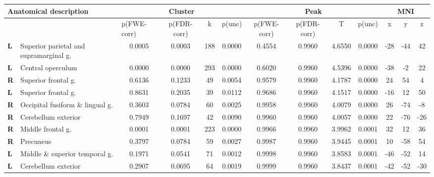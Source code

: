 \begin{landscape}
\begin{fullwidth}
\begin{table}[!ht]
    \vspace{-4cm}
    \raggedright
    \footnotesize
    \begin{tabular}{ll|cccc|cccc|ccc} \\ \hline
        \multicolumn{2}{l}{\textbf{Anatomical description}} & \multicolumn{4}{c}{\textbf{Cluster}} & \multicolumn{4}{c}{\textbf{Peak}} &  \multicolumn{3}{c}{\textbf{MNI}} \\ \hline
        \multicolumn{2}{l}{\textbf{}} & \multicolumn{1}{l}{p(FWE-corr)} & p(FDR-corr) & k & \multicolumn{1}{l}{p(unc)} & p(FWE-corr) & p(FDR-corr) & T & \multicolumn{1}{l}{p(unc)} & x & y & z \\ \hline
        \textbf{L} & Superior parietal and supramarginal g. & 0.0005 & 0.0003 & 188 & 0.0000 & 0.4554 & 0.9960 & 4.6550 & 0.0000 & -28 & -44 & 42 \\
        \textbf{L} & Central operculum & 0.0000 & 0.0000 & 293 & 0.0000 & 0.6020 & 0.9960 & 4.5396 & 0.0000 & -38 & -2 & 22 \\
        \textbf{R} & Superior frontal g. & 0.6136 & 0.1233 & 49 & 0.0054 & 0.9579 & 0.9960 & 4.1787 & 0.0000 & 24 & 54 & 4 \\
        \textbf{L} & Superior frontal g. & 0.8631 & 0.2035 & 39 & 0.0112 & 0.9686 & 0.9960 & 4.1517 & 0.0000 & -16 & 12 & 50 \\
        \textbf{R} & Occipital fusiform \& lingual g. & 0.3603 & 0.0784 & 60 & 0.0025 & 0.9958 & 0.9960 & 4.0079 & 0.0000 & 26 & -74 & -8 \\
        \textbf{R} & Cerebellum exterior & 0.7949 & 0.1697 & 42 & 0.0090 & 0.9960 & 0.9960 & 4.0057 & 0.0000 & 22 & -76 & -26 \\
        \textbf{R} & Middle frontal g. & 0.0001 & 0.0001 & 223 & 0.0000 & 0.9966 & 0.9960 & 3.9962 & 0.0001 & 32 & 12 & 36 \\
        \textbf{R} & Precuneus & 0.3797 & 0.0784 & 59 & 0.0027 & 0.9987 & 0.9960 & 3.9445 & 0.0001 & 10 & -58 & 54 \\
        \textbf{L} & Middle \& superior temporal g. & 0.1971 & 0.0541 & 71 & 0.0012 & 0.9998 & 0.9960 & 3.8583 & 0.0001 & -46 & -52 & 14 \\
        \textbf{L} & Cerebellum exterior & 0.2907 & 0.0695 & 64 & 0.0019 & 0.9999 & 0.9960 & 3.8437 & 0.0001 & -42 & -52 & -30 \\

\end{tabular}
\end{table}
\end{fullwidth}
\end{landscape}
